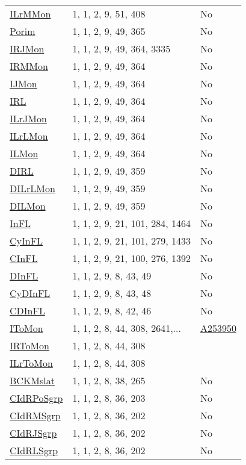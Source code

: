 {\begin{tabular}{|l|l|l|}
\hyperlink{ILrMMon}{ILrMMon}& 1, 1, 2, 9, 51, 408 &No\\
\hyperlink{Porim}{Porim}& 1, 1, 2, 9, 49, 365 &No\\
\hyperlink{IRJMon}{IRJMon}& 1, 1, 2, 9, 49, 364, 3335 &No\\
\hyperlink{IRMMon}{IRMMon}& 1, 1, 2, 9, 49, 364 &No\\
\hyperlink{IJMon}{IJMon}& 1, 1, 2, 9, 49, 364 &No\\
\hyperlink{IRL}{IRL}& 1, 1, 2, 9, 49, 364 &No\\
\hyperlink{ILrJMon}{ILrJMon}& 1, 1, 2, 9, 49, 364 &No\\
\hyperlink{ILrLMon}{ILrLMon}& 1, 1, 2, 9, 49, 364 &No\\
\hyperlink{ILMon}{ILMon}& 1, 1, 2, 9, 49, 364 &No\\
\hyperlink{DIRL}{DIRL}& 1, 1, 2, 9, 49, 359 &No\\
\hyperlink{DILrLMon}{DILrLMon}& 1, 1, 2, 9, 49, 359 &No\\
\hyperlink{DILMon}{DILMon}& 1, 1, 2, 9, 49, 359 &No\\
\hyperlink{InFL}{InFL}& 1, 1, 2, 9, 21, 101, 284, 1464 &No\\
\hyperlink{CyInFL}{CyInFL}& 1, 1, 2, 9, 21, 101, 279, 1433 &No\\
\hyperlink{CInFL}{CInFL}& 1, 1, 2, 9, 21, 100, 276, 1392 &No\\
\hyperlink{DInFL}{DInFL}& 1, 1, 2, 9, 8, 43, 49 &No\\
\hyperlink{CyDInFL}{CyDInFL}& 1, 1, 2, 9, 8, 43, 48 &No\\
\hyperlink{CDInFL}{CDInFL}& 1, 1, 2, 9, 8, 42, 46 &No\\
\hyperlink{IToMon}{IToMon}& 1, 1, 2, 8, 44, 308, 2641,... &\href{http://oeis.org/A253950}{A253950}\\
\hyperlink{IRToMon}{IRToMon}& 1, 1, 2, 8, 44, 308 &\\
\hyperlink{ILrToMon}{ILrToMon}& 1, 1, 2, 8, 44, 308 &\\
\hyperlink{BCKMslat}{BCKMslat}& 1, 1, 2, 8, 38, 265 &No\\
\hyperlink{CIdRPoSgrp}{CIdRPoSgrp}& 1, 1, 2, 8, 36, 203 &No\\
\hyperlink{CIdRMSgrp}{CIdRMSgrp}& 1, 1, 2, 8, 36, 202 &No\\
\hyperlink{CIdRJSgrp}{CIdRJSgrp}& 1, 1, 2, 8, 36, 202 &No\\
\hyperlink{CIdRLSgrp}{CIdRLSgrp}& 1, 1, 2, 8, 36, 202 &No\\

\end{tabular}}
